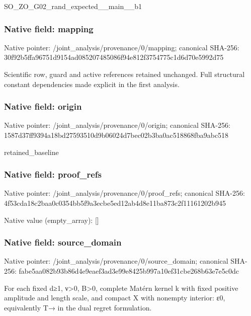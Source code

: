 \documentclass[10pt,a4paper]{article}
\begin{document}
\begingroup\raggedright\sloppy SO\_\allowbreak{}ZO\_\allowbreak{}G02\_\allowbreak{}rand\_\allowbreak{}expected\_\allowbreak{}\_\allowbreak{}main\_\allowbreak{}\_\allowbreak{}b1\par\endgroup

\subsubsection{Native field: mapping}
Native pointer: /joint\_\allowbreak{}analysis/provenance/0/mapping; canonical SHA-256: 30f92b5ffa96751d9154ad085207485086f94e812f3754775c1d6d70e5992d75

\begingroup\raggedright\sloppy Scientific row,\allowbreak{} guard and active references retained unchanged. Full structural constant dependencies made explicit in the first analysis.\par\endgroup

\subsubsection{Native field: origin}
Native pointer: /joint\_\allowbreak{}analysis/provenance/0/origin; canonical SHA-256: 1587d37ff9394a18bd27593510d9b06024d7bec02b3ba0ac518868fba9abc518

\begingroup\raggedright\sloppy retained\_\allowbreak{}baseline\par\endgroup

\subsubsection{Native field: proof\_\allowbreak{}refs}
Native pointer: /joint\_\allowbreak{}analysis/provenance/0/proof\_\allowbreak{}refs; canonical SHA-256: 4f53cda18c2baa0c0354bb5f9a3ecbe5ed12ab4d8e11ba873c2f11161202b945

Native value (empty\_\allowbreak{}array): []

\subsubsection{Native field: source\_\allowbreak{}domain}
Native pointer: /joint\_\allowbreak{}analysis/provenance/0/source\_\allowbreak{}domain; canonical SHA-256: fabe5aa082b93b86d4e9eaef3ad3e99e8425b997a10ef31cbe268b63e7e5c0dc

\begingroup\raggedright\sloppy For each fixed d{\AtlasUnicodeSymbols ≥}\allowbreak{}1,\allowbreak{} {\AtlasUnicodeText ν}\allowbreak{}>0,\allowbreak{} B>0,\allowbreak{} complete Mat{\AtlasUnicodeText é}\allowbreak{}rn kernel k with fixed positive amplitude and length scale,\allowbreak{} and compact X with nonempty interior:\allowbreak{} {\AtlasUnicodeText ε}\allowbreak{}0,\allowbreak{} equivalently T{\AtlasUnicodeSymbols →}\allowbreak{} in the dual regret formulation.\par\endgroup
\end{document}
